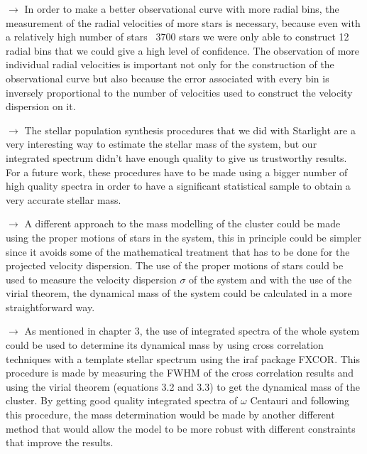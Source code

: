 $\rightarrow$ In order to make a better observational curve with more radial bins, the measurement of the radial velocities of more stars is necessary, because even with a relatively high number of stars ~3700 stars we were only able to construct 12 radial bins that we could give a high level of confidence. The observation of more individual radial velocities is important not only for the construction of the observational curve but also because the error associated with every bin is inversely proportional to the number of velocities used to construct the velocity dispersion on it. 

$\rightarrow$ The stellar population synthesis procedures that we did with Starlight are a very interesting way to estimate the stellar mass of the system, but our integrated spectrum didn't have enough quality to give us trustworthy results. For a future work, these procedures have to be made using a bigger number of high quality spectra in order to have a significant statistical sample to obtain a very accurate stellar mass.

$\rightarrow$ A different approach to the mass modelling of the cluster could be made using the proper motions of stars in the system, this in principle could be simpler since it avoids some of the mathematical treatment that has to be done for the projected velocity dispersion. The use of the proper motions of stars could be used to measure the velocity dispersion $\sigma$ of the system and with the use of the virial theorem, the dynamical mass of the system could be calculated in a more straightforward way.

$\rightarrow$ As mentioned in chapter 3, the use of integrated spectra of the whole system could be used to determine its dynamical mass by using cross correlation techniques with a template stellar spectrum using the iraf package FXCOR. This procedure is made by measuring the FWHM of the cross correlation results and using the virial theorem (equations 3.2 and 3.3) to get the dynamical mass of the cluster. By getting good quality integrated spectra of $\omega$ Centauri and following this procedure, the mass determination would be made by another different method that would allow the model to be more robust with different constraints that improve the results.


